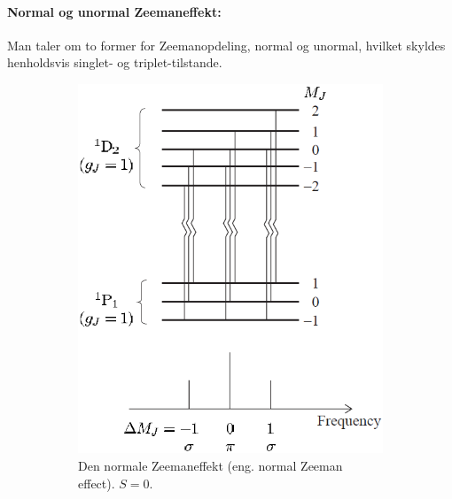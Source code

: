 \paragraph{Normal og unormal Zeemaneffekt:} Man taler om to former for Zeemanopdeling, normal og unormal, hvilket skyldes henholdsvis singlet- og triplet-tilstande.

\begin{figure}[!h]
    \centering
    \begin{subfigure}[t]{0.46\textwidth}
        \centering
        \includegraphics[width=\columnwidth]{Q15/images/NormalZeemanEffect.PNG}
        \caption{Den normale Zeemaneffekt (eng. normal Zeeman effect). $S = 0$.}
        \label{fig:Q15_NormalZeemanEffect}
    \end{subfigure}
    \hfill
    \begin{subfigure}[t]{0.46\textwidth}
        \centering

\end{subfigure}
\end{figure}
